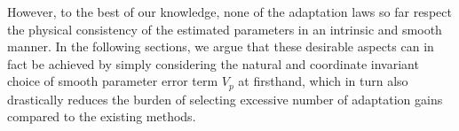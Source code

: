\documentclass[letterpaper, 10 pt, conference]{ieeeconf}  %
\begin{document}
However, to the best of our knowledge, none of the adaptation laws so far respect the physical consistency of the estimated parameters in an intrinsic and smooth manner. In the following sections, we argue that these desirable aspects can in fact be achieved by simply considering the natural and coordinate invariant choice of smooth parameter error term $V_{p}$ at firsthand, which in turn also drastically reduces the burden of selecting excessive number of adaptation gains compared to the existing methods.

\end{document}
